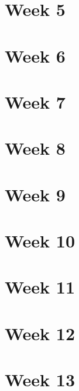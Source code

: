 \documentclass{article}
\begin{document}
    \section{Week 5}

    \section{Week 6}

    \section{Week 7}

    \section{Week 8}

    \section{Week 9}

    \section{Week 10}

    \section{Week 11}

    \section{Week 12}

    \section{Week 13}
\end{document}
